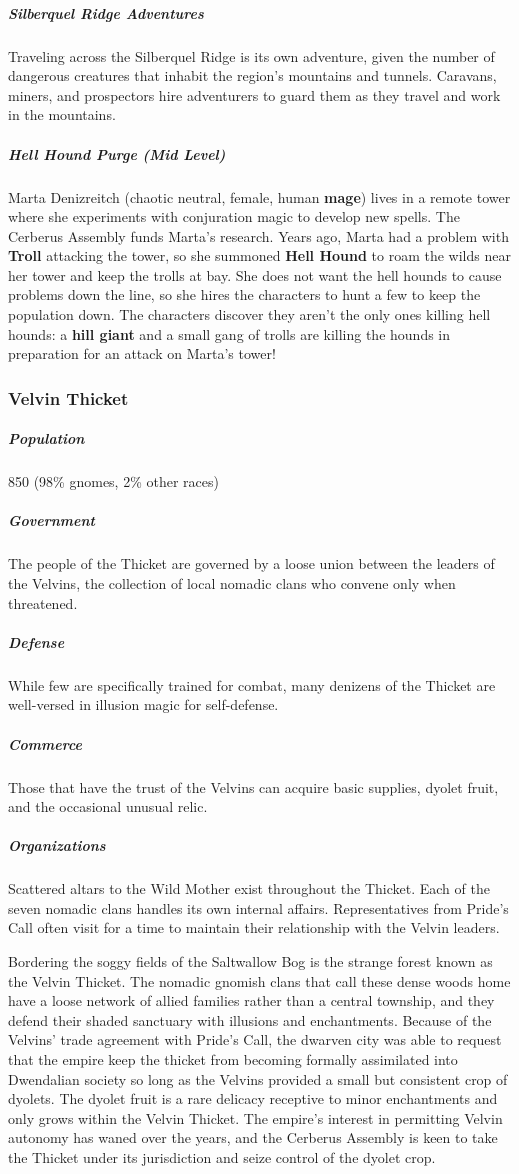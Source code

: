\documentclass[10pt,a4paper,twoside,bg=print,twocolumn,openany,nodeprecatedcode]{dndbook}
\begin{document}
\subparagraph{Silberquel Ridge Adventures}
Traveling across the Silberquel Ridge is its own adventure, given the number of dangerous creatures that inhabit the region's mountains and tunnels. Caravans, miners, and prospectors hire adventurers to guard them as they travel and work in the mountains.

\subparagraph{Hell Hound Purge (Mid Level)}
Marta Denizreitch (chaotic neutral, female, human \textbf{mage}) lives in a remote tower where she experiments with conjuration magic to develop new spells. The Cerberus Assembly funds Marta's research. Years ago, Marta had a problem with \textbf{Troll} attacking the tower, so she summoned \textbf{Hell Hound} to roam the wilds near her tower and keep the trolls at bay. She does not want the hell hounds to cause problems down the line, so she hires the characters to hunt a few to keep the population down. The characters discover they aren't the only ones killing hell hounds: a \textbf{hill giant} and a small gang of trolls are killing the hounds in preparation for an attack on Marta's tower!

\subsubsection{Velvin Thicket}
\subparagraph{Population}
850 (98\% gnomes, 2\% other races)

\subparagraph{Government}
The people of the Thicket are governed by a loose union between the leaders of the Velvins, the collection of local nomadic clans who convene only when threatened.

\subparagraph{Defense}
While few are specifically trained for combat, many denizens of the Thicket are well-versed in illusion magic for self-defense.

\subparagraph{Commerce}
Those that have the trust of the Velvins can acquire basic supplies, dyolet fruit, and the occasional unusual relic.

\subparagraph{Organizations}
Scattered altars to the Wild Mother exist throughout the Thicket. Each of the seven nomadic clans handles its own internal affairs. Representatives from Pride's Call often visit for a time to maintain their relationship with the Velvin leaders.

Bordering the soggy fields of the Saltwallow Bog is the strange forest known as the Velvin Thicket. The nomadic gnomish clans that call these dense woods home have a loose network of allied families rather than a central township, and they defend their shaded sanctuary with illusions and enchantments. Because of the Velvins' trade agreement with Pride's Call, the dwarven city was able to request that the empire keep the thicket from becoming formally assimilated into Dwendalian society so long as the Velvins provided a small but consistent crop of dyolets. The dyolet fruit is a rare delicacy receptive to minor enchantments and only grows within the Velvin Thicket. The empire's interest in permitting Velvin autonomy has waned over the years, and the Cerberus Assembly is keen to take the Thicket under its jurisdiction and seize control of the dyolet crop.
\end{document}
